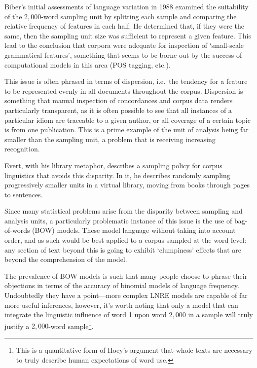 Biber's initial assessments of language variation in 1988\cite{biber1988variation} examined the suitability of the $2,000$-word sampling unit by splitting each sample and comparing the relative frequency of features in each half.  He determined that, if they were the same, then the sampling unit size was sufficient to represent a given feature.  This lead to the conclusion that corpora were adequate for inspection of `small-scale grammatical features', something that seems to be borne out by the success of computational models in this area (POS tagging, etc.).

This issue is often phrased in terms of dispersion, i.e.\ the tendency for a feature to be represented evenly in all documents throughout the corpus.  Dispersion is something that manual inspection of concordances and corpus data renders particularly transparent, as it is often possible to see that all instances of a particular idiom are traceable to a given author, or all coverage of a certain topic is from one publication.  This is a prime example of the unit of analysis being far smaller than the sampling unit, a problem that is receiving increasing recognition.

Evert, with his library metaphor\cite{evert2006random}, describes a sampling policy for corpus linguistics that avoids this disparity.  In it, he describes randomly sampling progressively smaller units in a virtual library, moving from books through pages to sentences.%

Since many statistical problems arise from the disparity between sampling and analysis units, a particularly problematic instance of this issue is the use of bag-of-words (BOW) models.  These model language without taking into account order, and as such would be best applied to a corpus sampled at the word level: any section of text beyond this is going to exhibit `clumpiness' effects that are beyond the comprehension of the model.

The prevalence of BOW models is such that many people choose to phrase their objections in terms of the accuracy of binomial models of language frequency\cite{kilgarriff2005language,evert2004simple,evert2007zipfr}.  Undoubtedly they have a point---more complex LNRE models are capable of far more useful inferences, however, it's worth noting that only a model that can integrate the linguistic influence of word 1 upon word $2,000$ in a sample will truly justify a $2,000$-word sample\footnote{This is a quantitative form of Hoey's argument that whole texts are necessary to truly describe human expectations of word use.}.

